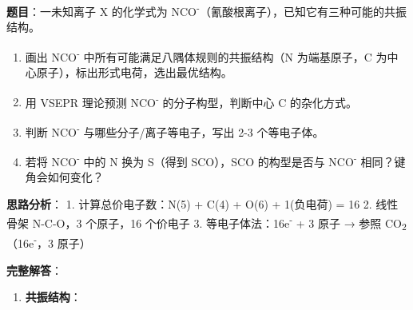 \documentclass[a4paper,11pt]{ctexart}
\providecommand{\tightlist}{\setlength{\itemsep}{0pt}\setlength{\parskip}{0pt}}
\begin{document}
\textbf{题目}：一未知离子 X 的化学式为 NCO\textsuperscript{-}（氰酸根离子），已知它有三种可能的共振结构。

\begin{enumerate}
\def\labelenumi{(\arabic{enumi})}
\tightlist
\item
  画出 NCO\textsuperscript{-} 中所有可能满足八隅体规则的共振结构（N 为端基原子，C 为中心原子），标出形式电荷，选出最优结构。
\item
  用 VSEPR 理论预测 NCO\textsuperscript{-} 的分子构型，判断中心 C 的杂化方式。
\item
  判断 NCO\textsuperscript{-} 与哪些分子/离子等电子，写出 2-3 个等电子体。
\item
  若将 NCO\textsuperscript{-} 中的 N 换为 S（得到 SCO），SCO 的构型是否与 NCO\textsuperscript{-} 相同？键角会如何变化？
\end{enumerate}

\textbf{思路分析}：
1. 计算总价电子数：N(5) + C(4) + O(6) + 1(负电荷) = 16
2. 线性骨架 N-C-O，3 个原子，16 个价电子
3. 等电子体法：16e\textsuperscript{-} + 3 原子 → 参照 CO\textsubscript{2}（16e\textsuperscript{-}，3 原子）

\textbf{完整解答}：

\begin{enumerate}
\def\labelenumi{(\arabic{enumi})}
\tightlist
\item
  \textbf{共振结构}：
\end{enumerate}
\end{document}
